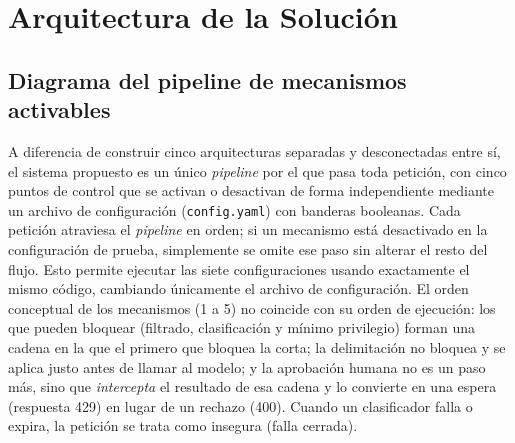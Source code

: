 \documentclass[11pt,letterpaper]{article}
\begin{document}
\section{Arquitectura de la Solución}

\subsection{Diagrama del pipeline de mecanismos activables}

A diferencia de construir cinco arquitecturas separadas y desconectadas entre sí, el sistema propuesto es un único \emph{pipeline} por el que pasa toda petición, con cinco puntos de control que se activan o desactivan de forma independiente mediante un archivo de configuración (\texttt{config.yaml}) con banderas booleanas. Cada petición atraviesa el \emph{pipeline} en orden; si un mecanismo está desactivado en la configuración de prueba, simplemente se omite ese paso sin alterar el resto del flujo. Esto permite ejecutar las siete configuraciones usando exactamente el mismo código, cambiando únicamente el archivo de configuración. El orden conceptual de los mecanismos (1 a 5) no coincide con su orden de ejecución: los que pueden bloquear (filtrado, clasificación y mínimo privilegio) forman una cadena en la que el primero que bloquea la corta; la delimitación no bloquea y se aplica justo antes de llamar al modelo; y la aprobación humana no es un paso más, sino que \emph{intercepta} el resultado de esa cadena y lo convierte en una espera (respuesta 429) en lugar de un rechazo (400). Cuando un clasificador falla o expira, la petición se trata como insegura (falla cerrada).
\end{document}
